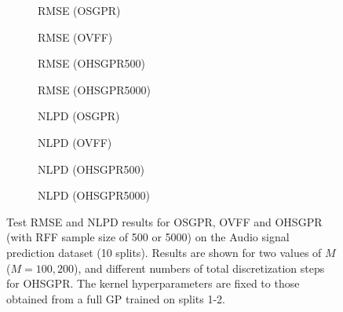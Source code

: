 \begin{figure}[htbp]
\captionsetup[subfigure]{font=scriptsize,labelfont=scriptsize}
  \centering
   \begin{subfigure}[b]{0.24\textwidth}
      \centering
      \scalebox{0.35}{
      
      }
      \caption{RMSE (OSGPR)}
      \label{fig:timit_rmse_iter}
  \end{subfigure}
  \begin{subfigure}[b]{0.24\textwidth}
      \centering
      \scalebox{0.35}{
      
      }
      \caption{RMSE (OVFF)}
      \label{fig:timit_rmse_vff}
  \end{subfigure}
  \begin{subfigure}[b]{0.24\textwidth}
      \centering
      \scalebox{0.35}{
      
      }
      \caption{RMSE (OHSGPR500)}
      \label{fig:timit_rmse_disc_500}
  \end{subfigure}
  \begin{subfigure}[b]{0.24\textwidth}
      \centering
      \scalebox{0.35}{
      
      }
      \caption{RMSE (OHSGPR5000)}
      \label{fig:timit_rmse_disc_5000}
  \end{subfigure}
  \begin{subfigure}[b]{0.24\textwidth}
      \centering
      \scalebox{0.35}{
      
      }
      \caption{NLPD (OSGPR)}
      \label{fig:timit_nlpd_iter}
  \end{subfigure}
  \begin{subfigure}[b]{0.24\textwidth}
      \centering
      \scalebox{0.35}{
      
      }
      \caption{NLPD (OVFF)}
      \label{fig:timit_nlpd_vff}
  \end{subfigure}
  \begin{subfigure}[b]{0.24\textwidth}
      \centering
      \scalebox{0.35}{
      
      }
      \caption{NLPD (OHSGPR500)}
      \label{fig:timit_nlpd_disc_500}
  \end{subfigure}
  \begin{subfigure}[b]{0.24\textwidth}
      \centering
      \scalebox{0.35}{
      
      }
      \caption{NLPD (OHSGPR5000)}
      \label{fig:timit_nlpd_disc_5000}
  \end{subfigure}
  \caption{Test RMSE and NLPD results for OSGPR, OVFF and OHSGPR (with RFF sample size of 500 or 5000) on the Audio signal prediction dataset (10 splits). Results are shown for two values of $M$ ($M = 100, 200$), and different numbers of total discretization steps for OHSGPR. The kernel hyperparameters are fixed to those obtained from a full GP trained on splits 1-2.}
  \label{fig:timit_comparison_disc_fixed_kernel}
\end{figure}

